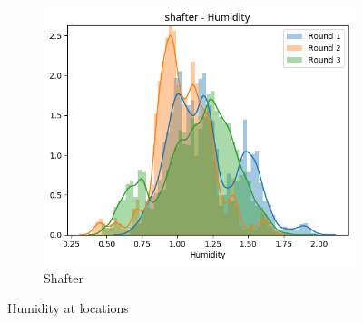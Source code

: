 \documentclass{article}
\begin{document}
\begin{figure}
\begin{subfigure}{0.32\textwidth}
\includegraphics[width=\textwidth]{results/distributions/location_shafter_humidity.png}
\caption{Shafter}
\end{subfigure}
\caption{Humidity at locations}
\label{fig:humidity-locations}
\end{figure}
\end{document}
